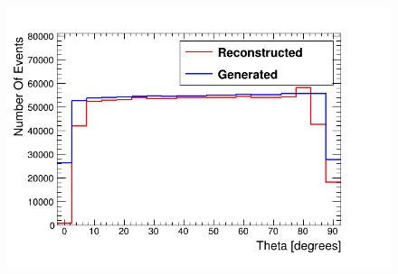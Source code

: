 \begin{figure}[!h]
 \centering
 \includegraphics[width=0.8\linewidth]{Chapter5/Figs/Raster/hemisphereThetaCompare.png}
 \label{fig:thetaGenVsRecoHem}
\end{figure}

